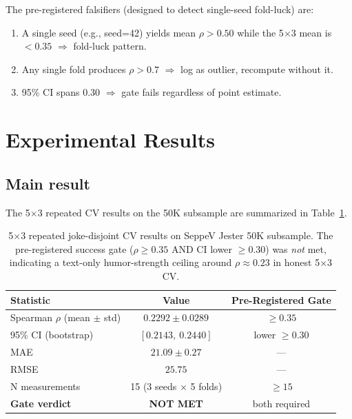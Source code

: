 \documentclass[11pt, letterpaper]{article}
\begin{document}
The pre-registered falsifiers (designed to detect single-seed fold-luck) are:
\begin{enumerate}
\item A single seed (e.g., seed=42) yields mean $\rho > 0.50$ while the 5$\times$3 mean is $< 0.35$ $\Rightarrow$ fold-luck pattern.
\item Any single fold produces $\rho > 0.7$ $\Rightarrow$ log as outlier, recompute without it.
\item 95\% CI spans 0.30 $\Rightarrow$ gate fails regardless of point estimate.
\end{enumerate}

\section{Experimental Results}

\subsection{Main result}

The 5$\times$3 repeated CV results on the 50K subsample are summarized in Table~\ref{tab:main}.

\begin{table}[h]
\centering
\begin{tabular}{lcc}
\toprule
\textbf{Statistic} & \textbf{Value} & \textbf{Pre-Registered Gate} \\
\midrule
Spearman $\rho$ (mean $\pm$ std)  & $0.2292 \pm 0.0289$ & $\geq 0.35$ \\
95\% CI (bootstrap)               & $[0.2143,\ 0.2440]$ & lower $\geq 0.30$ \\
MAE                              & $21.09 \pm 0.27$      & ---                          \\
RMSE                             & $25.75$              & ---                          \\
N measurements                   & 15 (3 seeds $\times$ 5 folds) & $\geq 15$ \\
\midrule
\textbf{Gate verdict}            & \textbf{NOT MET}     & both required              \\
\bottomrule
\end{tabular}
\caption{5$\times$3 repeated joke-disjoint CV results on SeppeV Jester 50K subsample.
The pre-registered success gate ($\rho \geq 0.35$ AND CI lower $\geq 0.30$)
was \emph{not} met, indicating a text-only humor-strength ceiling around
$\rho \approx 0.23$ in honest 5$\times$3 CV.}
\label{tab:main}
\end{table}
\end{document}
